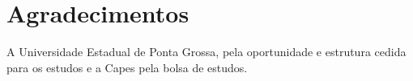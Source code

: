 \chapter*{Agradecimentos}
A Universidade Estadual de Ponta Grossa, pela oportunidade e estrutura cedida para os estudos e a Capes pela bolsa de estudos.

